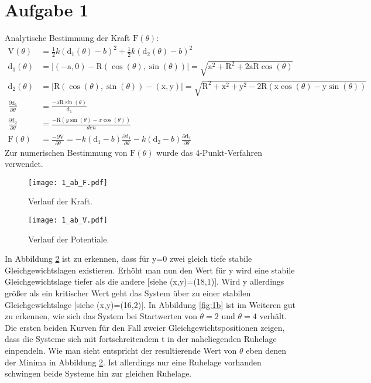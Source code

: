 \documentclass[paper=a4, ngerman]{scrartcl}
\begin{document}
\section*{Aufgabe 1}
Analytische Bestimmung der Kraft $\mathrm{F}(\theta)$:
\begin{align}
    \nonumber \mathrm{V}\left(\theta\right)&=\frac12 k\left(\mathrm{d}_1(\theta)-b\right)^2+\frac12 k\left(\mathrm{d}_2(\theta)-b\right)^2\\[5pt]
    \nonumber \mathrm{d}_1(\theta)&=\vert (-\mathrm{a},0) - \mathrm{R}(\cos(\theta),\sin(\theta))\vert = \sqrt{\mathrm{a}^2+\mathrm{R}^2+2\mathrm{aR}\cos(\theta)}\\[5pt]
    \nonumber \mathrm{d}_2(\theta)&=\vert \mathrm{R}(\cos(\theta),\sin(\theta)) - (\mathrm{x},\mathrm{y})\vert =\sqrt{\mathrm{R}^2+\mathrm{x}^2+\mathrm{y}^2-2\mathrm{R}\left(\mathrm{x}\cos(\theta)-\mathrm{y}\sin(\theta)\right)}\\[5pt]
    \nonumber \frac{\partial\mathrm{d}_1}{\partial\theta}&= \frac{-\mathrm{aR}\sin(\theta)}{\mathrm{d}_1}\\[5pt]
    \nonumber \frac{\partial\mathrm{d}_2}{\partial\theta}&= \frac{-\mathrm{R}\left(y\sin(\theta)-x\cos(\theta)\right)}{den}\\[5pt]
    \nonumber \mathrm{F}(\theta)&=\frac{-\partial\mathrm{V}}{\partial\theta}=-k\left(\mathrm{d}_1-b\right)\frac{\partial \mathrm{d}_1}{\partial\theta}-k\left(\mathrm{d}_2-b\right)\frac{\partial \mathrm{d}_2}{\partial\theta}
\end{align}
Zur numerischen Bestimmung von $\mathrm{F}(\theta)$ wurde das 4-Punkt-Verfahren verwendet.

\begin{figure}[htbp]
	\centering
	\texttt{[image: 1\_ab\_F.pdf]}
	\caption{Verlauf der Kraft.}
	\label{fig:1F}
\end{figure}

\begin{figure}[htbp]
	\centering
	\texttt{[image: 1\_ab\_V.pdf]}
	\caption{Verlauf der Potentiale.}
	\label{fig:1V}
\end{figure}

In Abbildung \ref{fig:1V} ist zu erkennen, dass für y=0 zwei gleich tiefe stabile Gleichgewichtslagen existieren. Erhöht man nun den Wert für y wird eine stabile Gleichgewichtslage tiefer als die andere [siehe (x,y)=(18,1)]. Wird y allerdings größer als ein kritischer Wert geht das System über zu einer stabilen Gleichgewichtslage [siehe (x,y)=(16,2)]. In Abbildung \ref{fig:1b} ist im Weiteren gut zu erkennen, wie sich das System bei Startwerten von $\theta=2$ und $\theta=4$ verhält. Die ersten beiden Kurven für den Fall zweier Gleichgewichtspositionen zeigen, dass die Systeme sich mit fortschreitendem t in der naheliegenden Ruhelage einpendeln. Wie man sieht entspricht der resultierende Wert von $\theta$ eben denen der Minima in Abbildung \ref{fig:1V}. Ist allerdings nur eine Ruhelage vorhanden schwingen beide Systeme hin zur gleichen Ruhelage.
\end{document}
